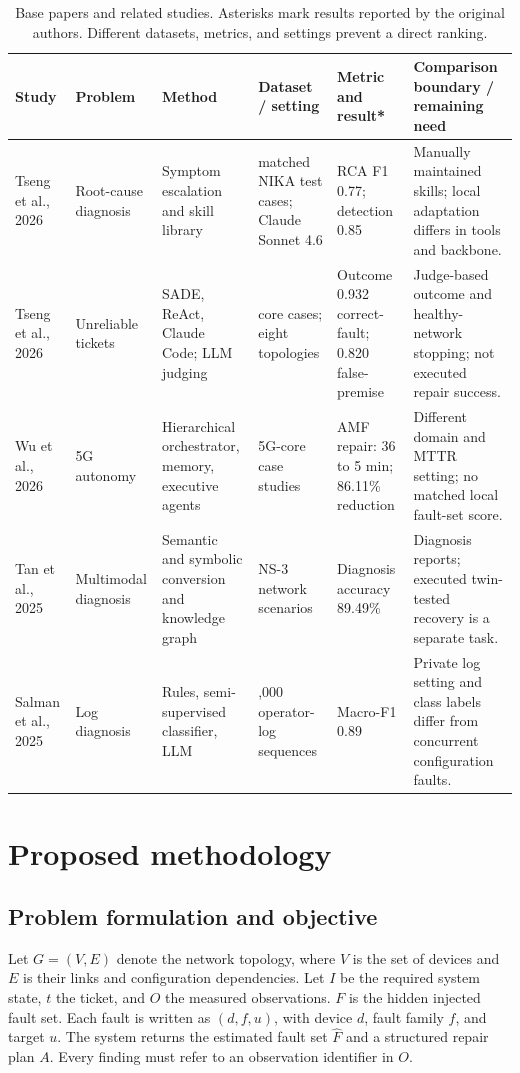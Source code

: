 \documentclass[pdflatex,sn-mathphys-num,iicol]{sn-jnl}
\begin{document}
\begin{table}[t]
\caption{Base papers and related studies. Asterisks mark results reported by the original authors. Different datasets, metrics, and settings prevent a direct ranking.}\label{tab:literature}
\centering\scriptsize
\begin{tabularx}{\textwidth}{@{}>{\raggedright\arraybackslash}p{1.65cm}>{\raggedright\arraybackslash}p{1.7cm}>{\raggedright\arraybackslash}p{2.25cm}>{\raggedright\arraybackslash}p{2.2cm}>{\raggedright\arraybackslash}p{2.0cm}>{\raggedright\arraybackslash}X@{}}
\toprule
Study & Problem & Method & Dataset / setting & Metric and result* & Comparison boundary / remaining need \\
\midrule
Tseng et al., 2026 \cite{sade} & Root-cause diagnosis & Symptom escalation and skill library & 523 matched NIKA test cases; Claude Sonnet 4.6 & RCA F1 0.77; detection 0.85 & Manually maintained skills; local adaptation differs in tools and backbone. \\
Tseng et al., 2026 \cite{faultbench} & Unreliable tickets & SADE, ReAct, Claude Code; LLM judging & 200 core cases; eight topologies & Outcome 0.932 correct-fault; 0.820 false-premise & Judge-based outcome and healthy-network stopping; not executed repair success. \\
Wu et al., 2026 \cite{hana} & 5G autonomy & Hierarchical orchestrator, memory, executive agents & 5G-core case studies & AMF repair: 36 to 5 min; 86.11\% reduction & Different domain and MTTR setting; no matched local fault-set score. \\
Tan et al., 2025 \cite{netsemantic} & Multimodal diagnosis & Semantic and symbolic conversion and knowledge graph & NS-3 network scenarios & Diagnosis accuracy 89.49\% & Diagnosis reports; executed twin-tested recovery is a separate task. \\
Salman et al., 2025 \cite{hylift} & Log diagnosis & Rules, semi-supervised classifier, LLM & 8,000 operator-log sequences & Macro-F1 0.89 & Private log setting and class labels differ from concurrent configuration faults. \\
\bottomrule
\end{tabularx}
\end{table}

\section{Proposed methodology}\label{sec:method}
\subsection{Problem formulation and objective}
Let $G=(V,E)$ denote the network topology, where $V$ is the set of devices and $E$ is their links and configuration dependencies. Let $I$ be the required system state, $t$ the ticket, and $O$ the measured observations. $F$ is the hidden injected fault set. Each fault is written as $(d,f,u)$, with device $d$, fault family $f$, and target $u$. The system returns the estimated fault set $\widehat F$ and a structured repair plan $A$. Every finding must refer to an observation identifier in $O$.
\end{document}
